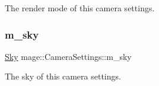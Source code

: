 The render mode of this camera settings. \hypertarget{classmage_1_1_camera_settings_a04d1f51641e049d027cce65f596d33cc}{}\label{classmage_1_1_camera_settings_a04d1f51641e049d027cce65f596d33cc} 
\subsubsection{\texorpdfstring{m\+\_\+sky}{m\_sky}}
{\footnotesize\ttfamily \hyperlink{classmage_1_1_sky}{Sky} mage\+::\+Camera\+Settings\+::m\+\_\+sky\hspace{0.3cm}{\ttfamily [private]}}

The sky of this camera settings. 